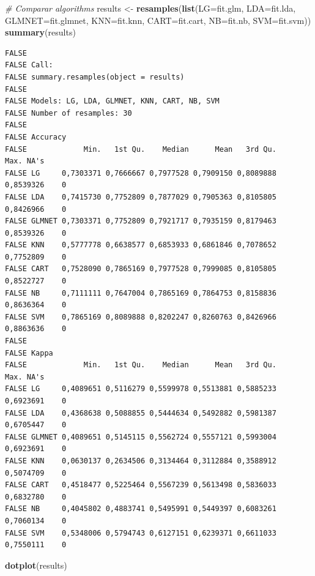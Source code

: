 \documentclass[]{article}
\newenvironment{Shaded}{\begin{snugshade}}{\end{snugshade}}
\newcommand{\KeywordTok}[1]{\textcolor[rgb]{0.13,0.29,0.53}{\textbf{#1}}}
\newcommand{\DataTypeTok}[1]{\textcolor[rgb]{0.13,0.29,0.53}{#1}}
\newcommand{\StringTok}[1]{\textcolor[rgb]{0.31,0.60,0.02}{#1}}
\newcommand{\CommentTok}[1]{\textcolor[rgb]{0.56,0.35,0.01}{\textit{#1}}}
\newcommand{\NormalTok}[1]{#1}
\begin{document}
\begin{Shaded}
\begin{Highlighting}[]
\CommentTok{# Comparar algorithms}
\NormalTok{results <-}\StringTok{ }\KeywordTok{resamples}\NormalTok{(}\KeywordTok{list}\NormalTok{(}\DataTypeTok{LG=}\NormalTok{fit.glm, }\DataTypeTok{LDA=}\NormalTok{fit.lda, }\DataTypeTok{GLMNET=}\NormalTok{fit.glmnet, }\DataTypeTok{KNN=}\NormalTok{fit.knn,}
    \DataTypeTok{CART=}\NormalTok{fit.cart, }\DataTypeTok{NB=}\NormalTok{fit.nb, }\DataTypeTok{SVM=}\NormalTok{fit.svm))}
\KeywordTok{summary}\NormalTok{(results)}
\end{Highlighting}
\end{Shaded}

\begin{verbatim}
FALSE 
FALSE Call:
FALSE summary.resamples(object = results)
FALSE 
FALSE Models: LG, LDA, GLMNET, KNN, CART, NB, SVM 
FALSE Number of resamples: 30 
FALSE 
FALSE Accuracy 
FALSE             Min.   1st Qu.    Median      Mean   3rd Qu.      Max. NA's
FALSE LG     0,7303371 0,7666667 0,7977528 0,7909150 0,8089888 0,8539326    0
FALSE LDA    0,7415730 0,7752809 0,7877029 0,7905363 0,8105805 0,8426966    0
FALSE GLMNET 0,7303371 0,7752809 0,7921717 0,7935159 0,8179463 0,8539326    0
FALSE KNN    0,5777778 0,6638577 0,6853933 0,6861846 0,7078652 0,7752809    0
FALSE CART   0,7528090 0,7865169 0,7977528 0,7999085 0,8105805 0,8522727    0
FALSE NB     0,7111111 0,7647004 0,7865169 0,7864753 0,8158836 0,8636364    0
FALSE SVM    0,7865169 0,8089888 0,8202247 0,8260763 0,8426966 0,8863636    0
FALSE 
FALSE Kappa 
FALSE             Min.   1st Qu.    Median      Mean   3rd Qu.      Max. NA's
FALSE LG     0,4089651 0,5116279 0,5599978 0,5513881 0,5885233 0,6923691    0
FALSE LDA    0,4368638 0,5088855 0,5444634 0,5492882 0,5981387 0,6705447    0
FALSE GLMNET 0,4089651 0,5145115 0,5562724 0,5557121 0,5993004 0,6923691    0
FALSE KNN    0,0630137 0,2634506 0,3134464 0,3112884 0,3588912 0,5074709    0
FALSE CART   0,4518477 0,5225464 0,5567239 0,5613498 0,5836033 0,6832780    0
FALSE NB     0,4045802 0,4883741 0,5495991 0,5449397 0,6083261 0,7060134    0
FALSE SVM    0,5348006 0,5794743 0,6127151 0,6239371 0,6611033 0,7550111    0
\end{verbatim}

\begin{Shaded}
\begin{Highlighting}[]
\KeywordTok{dotplot}\NormalTok{(results)}
\end{Highlighting}
\end{Shaded}
\end{document}
